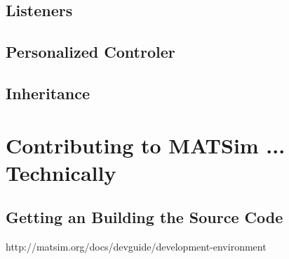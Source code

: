 \subsection{Listeners}

\subsection{Personalized Controler}

\subsection{Inheritance}



\section{Contributing to MATSim ... Technically}
\subsection{Getting an Building the Source Code}
http://matsim.org/docs/devguide/development-environment



